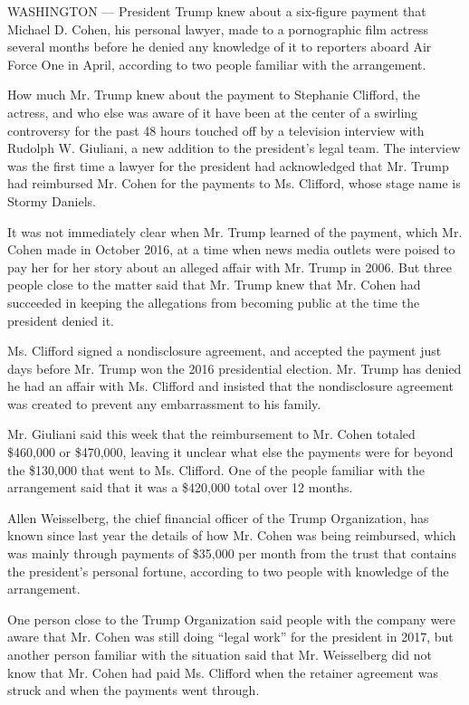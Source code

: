 WASHINGTON --- President Trump knew about a six-figure payment that
Michael D. Cohen, his personal lawyer, made to a pornographic film
actress several months before he denied any knowledge of it to reporters
aboard Air Force One in April, according to two people familiar with the
arrangement.

How much Mr. Trump knew about the payment to Stephanie Clifford, the
actress, and who else was aware of it have been at the center of a
swirling controversy for the past 48 hours touched off by a television
interview with Rudolph W. Giuliani, a new addition to the president's
legal team. The interview was the first time a lawyer for the president
had acknowledged that Mr. Trump had reimbursed Mr. Cohen for the
payments to Ms. Clifford, whose stage name is Stormy Daniels.

It was not immediately clear when Mr. Trump learned of the payment,
which Mr. Cohen made in October 2016, at a time when news media outlets
were poised to pay her for her story about an alleged affair with Mr.
Trump in 2006. But three people close to the matter said that Mr. Trump
knew that Mr. Cohen had succeeded in keeping the allegations from
becoming public at the time the president denied it.

Ms. Clifford signed a nondisclosure agreement, and accepted the payment
just days before Mr. Trump won the 2016 presidential election. Mr. Trump
has denied he had an affair with Ms. Clifford and insisted that the
nondisclosure agreement was created to prevent any embarrassment to his
family.

Mr. Giuliani said this week that the reimbursement to Mr. Cohen totaled
\$460,000 or \$470,000, leaving it unclear what else the payments were
for beyond the \$130,000 that went to Ms. Clifford. One of the people
familiar with the arrangement said that it was a \$420,000 total over 12
months.

Allen Weisselberg, the chief financial officer of the Trump
Organization, has known since last year the details of how Mr. Cohen was
being reimbursed, which was mainly through payments of \$35,000 per
month from the trust that contains the president's personal fortune,
according to two people with knowledge of the arrangement.

One person close to the Trump Organization said people with the company
were aware that Mr. Cohen was still doing ``legal work'' for the
president in 2017, but another person familiar with the situation said
that Mr. Weisselberg did not know that Mr. Cohen had paid Ms. Clifford
when the retainer agreement was struck and when the payments went
through.

